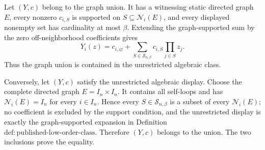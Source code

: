 Let \((Y,c)\) belong to the graph union. It has a witnessing static directed graph \(E\), every nonzero \(c_{i,S}\) is supported on \(S\subseteq\mathcal N_i(E)\), and every displayed nonempty set has cardinality at most \(\beta\). Extending the graph-supported sum by the zero off-neighborhood coefficients gives
\[
Y_i(z)=c_{i,\varnothing}+
\sum_{S\in\mathcal S_{n,\beta}}c_{i,S}\prod_{j\in S}z_j.
\]
Thus the graph union is contained in the unrestricted algebraic class.

Conversely, let \((Y,c)\) satisfy the unrestricted algebraic display. Choose the complete directed graph \(E=I_n\times I_n\). It contains all self-loops and has \(\mathcal N_i(E)=I_n\) for every \(i\in I_n\). Hence every \(S\in\mathcal S_{n,\beta}\) is a subset of every \(\mathcal N_i(E)\); no coefficient is excluded by the support condition, and the unrestricted display is exactly the graph-supported expansion in Definition~\(\mathrm{def{:}published\text{-}low\text{-}order\text{-}class}\). Therefore \((Y,c)\) belongs to the union. The two inclusions prove the equality.